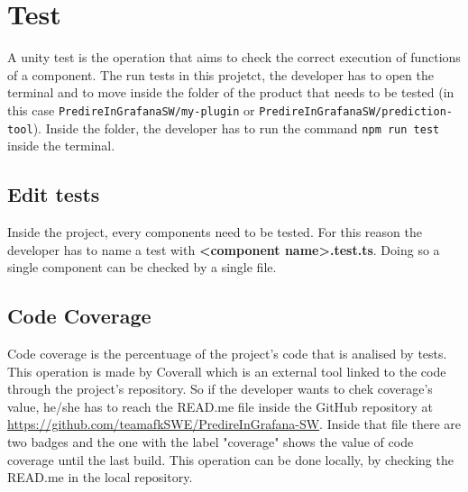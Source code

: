 \section{Test}
A unity test is the operation that aims to check the correct execution of functions of a component.
The run tests in this projetct, the developer has to open the terminal and to move inside the folder of the product that needs to be tested (in this case \texttt{PredireInGrafanaSW/my-plugin} or \texttt{PredireInGrafanaSW/prediction-tool}). Inside the folder, the developer has to run the command \texttt{npm run test} inside the terminal. 
\subsection{Edit tests}
Inside the project, every components need to be tested. For this reason the developer has to name a test with \textbf{<component name>.test.ts}. Doing so a single component can be checked by a single file.
\subsection{Code Coverage}
Code coverage is the percentuage of the project's code that is analised by tests. This operation is made by Coverall which is an external tool linked to the code through the project's repository. So if the developer wants to chek coverage's value, he/she has to reach the READ.me file inside the GitHub repository at \url{https://github.com/teamafkSWE/PredireInGrafana-SW}. Inside that file there are two badges and the one with the label "coverage" shows the value of code coverage until the last build. This operation can be done locally, by checking the READ.me in the local repository. 